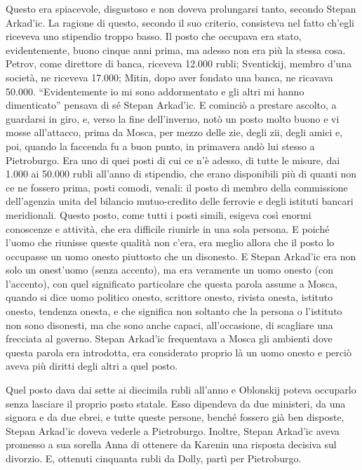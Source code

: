 Questo era spiacevole, disgustoso e non doveva prolungarsi tanto, secondo Stepan Arkad'ic. La ragione di questo, secondo il suo criterio, consisteva nel fatto ch'egli riceveva uno stipendio troppo basso. Il posto che occupava era stato, evidentemente, buono cinque anni prima, ma adesso non era più la stessa cosa. Petrov, come direttore di banca, riceveva 12.000 rubli; Sventickij, membro d'una società, ne riceveva 17.000; Mitin, dopo aver fondato una banca, ne ricavava 50.000. ``Evidentemente io mi sono addormentato e gli altri mi hanno dimenticato'' pensava di sé Stepan Arkad'ic. E cominciò a prestare ascolto, a guardarsi in giro, e, verso la fine dell'inverno, notò un posto molto buono e vi mosse all'attacco, prima da Mosca, per mezzo delle zie, degli zii, degli amici e, poi, quando la faccenda fu a buon punto, in primavera andò lui stesso a Pietroburgo. Era uno di quei posti di cui ce n'è adesso, di tutte le misure, dai 1.000 ai 50.000 rubli all'anno di stipendio, che erano disponibili più di quanti non ce ne fossero prima, posti comodi, venali: il posto di membro della commissione dell'agenzia unita del bilancio mutuo-credito delle ferrovie e degli istituti bancari meridionali. Questo posto, come tutti i posti simili, esigeva così enormi conoscenze e attività, che era difficile riunirle in una sola persona. E poiché l'uomo che riunisse queste qualità non c'era, era meglio allora che il posto lo occupasse un uomo onesto piuttosto che un disonesto. E Stepan Arkad'ic era non solo un onest'uomo (senza accento), ma era veramente un uomo onesto (con l'accento), con quel significato particolare che questa parola assume a Mosca, quando si dice uomo politico onesto, scrittore onesto, rivista onesta, istituto onesto, tendenza onesta, e che significa non soltanto che la persona o l'istituto non sono disonesti, ma che sono anche capaci, all'occasione, di scagliare una frecciata al governo. Stepan Arkad'ic frequentava a Mosca gli ambienti dove questa parola era introdotta, era considerato proprio là un uomo onesto e perciò aveva più diritti degli altri a quel posto. 

Quel posto dava dai sette ai diecimila rubli all'anno e Oblonskij poteva occuparlo senza lasciare il proprio posto statale. Esso dipendeva da due ministeri, da una signora e da due ebrei, e tutte queste persone, benché fossero già ben disposte, Stepan Arkad'ic doveva vederle a Pietroburgo. Inoltre, Stepan Arkad'ic aveva promesso a sua sorella Anna di ottenere da Karenin una risposta decisiva sul divorzio. E, ottenuti cinquanta rubli da Dolly, partì per Pietroburgo. 

